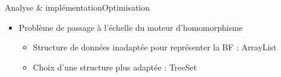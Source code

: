 \begin{frame}{Analyse \& implémentation}{Optimisation}
	\begin{itemize}
		\item Problème de passage à l'échelle du moteur d'homomorphisme
		\begin{itemize}
			\item Structure de données inadaptée pour représenter la BF : ArrayList
			\item	Choix d'une structure plus adaptée : TreeSet
		\end{itemize}
	\end{itemize}
\end{frame}

